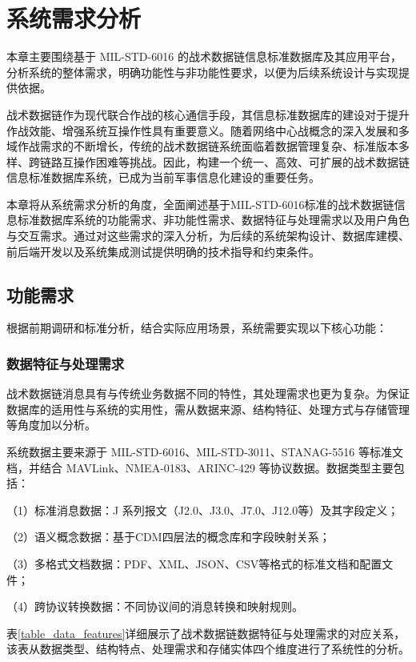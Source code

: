\chapter{系统需求分析}

本章主要围绕基于 MIL-STD-6016 的战术数据链信息标准数据库及其应用平台，分析系统的整体需求，明确功能性与非功能性要求，以便为后续系统设计与实现提供依据。

战术数据链作为现代联合作战的核心通信手段，其信息标准数据库的建设对于提升作战效能、增强系统互操作性具有重要意义。随着网络中心战概念的深入发展和多域作战需求的不断增长，传统的战术数据链系统面临着数据管理复杂、标准版本多样、跨链路互操作困难等挑战。因此，构建一个统一、高效、可扩展的战术数据链信息标准数据库系统，已成为当前军事信息化建设的重要任务。

本章将从系统需求分析的角度，全面阐述基于MIL-STD-6016标准的战术数据链信息标准数据库系统的功能需求、非功能性需求、数据特征与处理需求以及用户角色与交互需求。通过对这些需求的深入分析，为后续的系统架构设计、数据库建模、前后端开发以及系统集成测试提供明确的技术指导和约束条件。

\section{功能需求}

根据前期调研和标准分析，结合实际应用场景，系统需要实现以下核心功能：

\subsection{数据特征与处理需求}
战术数据链消息具有与传统业务数据不同的特性，其处理需求也更为复杂。为保证数据库的适用性与系统的实用性，需从数据来源、结构特征、处理方式与存储管理等角度加以分析\cite{baek2016_jsac}。

系统数据主要来源于 {MIL-STD-6016}、{MIL-STD-3011}、{STANAG-5516} 等标准文档，并结合 {MAVLink}、{NMEA-0183}、{ARINC-429} 等协议数据。数据类型主要包括：

（1）标准消息数据：J 系列报文（J2.0、J3.0、J7.0、J12.0等）及其字段定义；

（2）语义概念数据：基于CDM四层法的概念库和字段映射关系；

（3）多格式文档数据：PDF、XML、JSON、CSV等格式的标准文档和配置文件；

（4）跨协议转换数据：不同协议间的消息转换和映射规则。

表\ref{table_data_features}详细展示了战术数据链数据特征与处理需求的对应关系，该表从数据类型、结构特点、处理需求和存储实体四个维度进行了系统性的分析。

